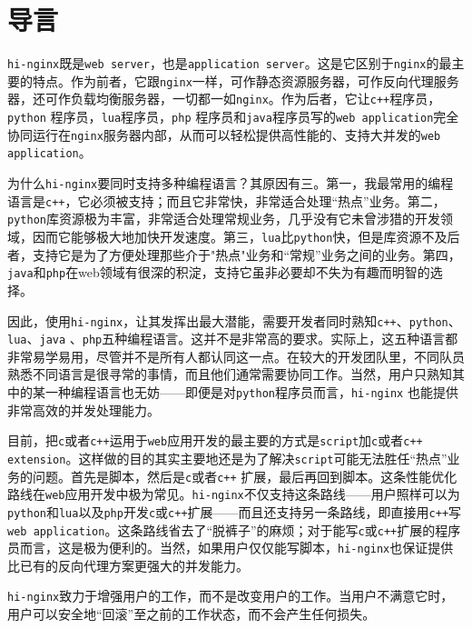 \section{导言}
\texttt{hi-nginx}既是\texttt{web server}，也是\texttt{application server}。这是它区别于\texttt{nginx}的最主要的特点。作为前者，它跟\texttt{nginx}一样，可作静态资源服务器，可作反向代理服务器，还可作负载均衡服务器，一切都一如\texttt{nginx}。作为后者，它让\texttt{c++}程序员，\texttt{python} 程序员，\texttt{lua}程序员，\texttt{php} 程序员和\texttt{java}程序员写的\texttt{web application}完全协同运行在\texttt{nginx}服务器内部，从而可以轻松提供高性能的、支持大并发的\texttt{web application}。

为什么\texttt{hi-nginx}要同时支持多种编程语言？其原因有三。第一，我最常用的编程语言是\texttt{c++}，它必须被支持；而且它非常快，非常适合处理“热点”业务。第二，\texttt{python}库资源极为丰富，非常适合处理常规业务，几乎没有它未曾涉猎的开发领域，因而它能够极大地加快开发速度。第三，\texttt{lua}比\texttt{python}快，但是库资源不及后者，支持它是为了方便处理那些介于"热点"业务和“常规”业务之间的业务。第四，\texttt{java}和\texttt{php}在web领域有很深的积淀，支持它虽非必要却不失为有趣而明智的选择。

因此，使用\texttt{hi-nginx}，让其发挥出最大潜能，需要开发者同时熟知\texttt{c++}、\texttt{python}、\texttt{lua}、\texttt{java} 、\texttt{php}五种编程语言。这并不是非常高的要求。实际上，这五种语言都非常易学易用，尽管并不是所有人都认同这一点。在较大的开发团队里，不同队员熟悉不同语言是很寻常的事情，而且他们通常需要协同工作。当然，用户只熟知其中的某一种编程语言也无妨——即便是对\texttt{python}程序员而言，\texttt{hi-nginx}	也能提供非常高效的并发处理能力。

目前，把\texttt{c}或者\texttt{c++}运用于\texttt{web}应用开发的最主要的方式是\texttt{script}加\texttt{c}或者\texttt{c++} \texttt{extension}。这样做的目的其实主要地还是为了解决\texttt{script}可能无法胜任“热点”业务的问题。首先是脚本，然后是\texttt{c}或者\texttt{c++} 扩展，最后再回到脚本。这条性能优化路线在\texttt{web}应用开发中极为常见。\texttt{hi-nginx}不仅支持这条路线——用户照样可以为\texttt{python}和\texttt{lua}以及\texttt{php}开发\texttt{c}或\texttt{c++}扩展——而且还支持另一条路线，即直接用\texttt{c++}写\texttt{web application}。这条路线省去了“脱裤子”的麻烦；对于能写\texttt{c}或\texttt{c++}扩展的程序员而言，这是极为便利的。当然，如果用户仅仅能写脚本，\texttt{hi-nginx}也保证提供比已有的反向代理方案更强大的并发能力。

\texttt{hi-nginx}致力于增强用户的工作，而不是改变用户的工作。当用户不满意它时，用户可以安全地“回滚”至之前的工作状态，而不会产生任何损失。